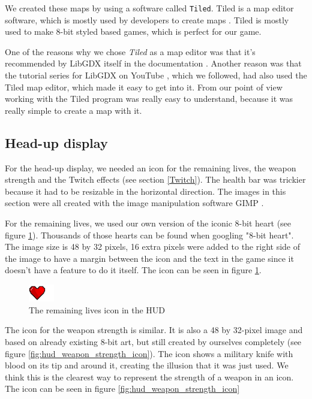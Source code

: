 \documentclass[12p]{article}
\begin{document}
We created these maps by using a software called \texttt{Tiled}. Tiled is a map editor software, which is mostly used by developers to create maps \cite{TiledMapEditor}. Tiled is mostly used to make 8-bit styled based games, which is perfect for our game.

One of the reasons why we chose \emph{Tiled} as a map editor was that it's recommended by LibGDX itself in the documentation \cite{TileMaps}. Another reason was that the tutorial series for LibGDX on YouTube \cite{BrentAureliSuperMarioBros}, which we followed, had also used the Tiled map editor, which made it easy to get into it. From our point of view working with the Tiled program was really easy to understand, because it was really simple to create a map with it.

\subsection{Head-up display}

For the head-up display, we needed an icon for the remaining lives, the weapon strength and the Twitch effects (see section \ref{Twitch}). The health bar was trickier because it had to be resizable in the horizontal direction. The images in this section were all created with the image manipulation software GIMP \cite{GIMP}.

For the remaining lives, we used our own version of the iconic 8-bit heart (see figure \ref{fig:hud_heart_icon}). Thousands of those hearts can be found when googling "8-bit heart". The image size is 48 by 32 pixels, 16 extra pixels were added to the right side of the image to have a margin between the icon and the text in the game since it doesn't have a feature to do it itself. The icon can be seen in figure \ref{fig:hud_heart_icon}.

\begin{figure}[ht]
  \center
  \includegraphics[width=0.1\textwidth]{Documentation/heart_icon.png}
  \caption{The remaining lives icon in the HUD}
  \label{fig:hud_heart_icon}
\end{figure}

The icon for the weapon strength is similar. It is also a 48 by 32-pixel image and based on already existing 8-bit art, but still created by ourselves completely (see figure \ref{fig:hud_weapon_strength_icon}). The icon shows a military knife with blood on its tip and around it, creating the illusion that it was just used. We think this is the clearest way to represent the strength of a weapon in an icon. The icon can be seen in figure \ref{fig:hud_weapon_strength_icon}
\end{document}

